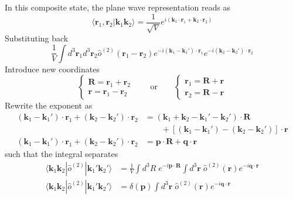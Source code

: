 \documentclass[../../../main.tex]{subfiles}
\begin{document}
In this composite state,  the plane wave representation reads as
\begin{equation*}
  \langle \mathbf{r}_1,\mathbf{r}_2 | \mathbf{k}_1 \mathbf{k}_2 \rangle
  = \frac{1 }{\sqrt{V}}  e ^{i(\mathbf{k}_1 \cdot  \mathbf{r}_1+\mathbf{k}_2 \cdot  \mathbf{r}_2)}
\end{equation*}
Substituting back
\begin{equation*}
  \frac{1}{V} \int d^3 \mathbf{r}_1 d^3 \mathbf{r}_2 \hat{o}^{(2)}(\mathbf{r}_1 -\mathbf{r}_2) e^{-i(\mathbf{k}_1 - \mathbf{k}_1') \cdot \mathbf{r}_1} e^{-i(\mathbf{k}_2 -\mathbf{k}_2') \cdot \mathbf{r}_2}
\end{equation*}
Introduce new coordinates
\begin{equation*}
  \begin{cases}
    \mathbf{R }=\mathbf{r }_1 +\mathbf{r}_2 \\
    \mathbf{r }=\mathbf{r }_1 -\mathbf{r}_2
  \end{cases}
  \qquad
  \text{or}
  \qquad
  \begin{cases}
    \mathbf{r}_1=\mathbf{R } +\mathbf{r} \\
    \mathbf{r}_2=\mathbf{R } -\mathbf{r}
  \end{cases}
\end{equation*}
Rewrite the exponent as
\begin{align*}
  (\mathbf{k}_1 - \mathbf{k}_1') \cdot \mathbf{r}_1 + (\mathbf{k}_2 - \mathbf{k}_2') \cdot \mathbf{r}_2
   & =  (\mathbf{k}_1 + \mathbf{k}_2 - \mathbf{k}_1' - \mathbf{k}_2') \cdot \mathbf{R }                     \\
   & \qquad+ \left[ (\mathbf{k}_1 - \mathbf{k}_1') - (\mathbf{k}_2 - \mathbf{k}_2') \right]\cdot \mathbf{r} \\
  (\mathbf{k}_1 - \mathbf{k}_1') \cdot \mathbf{r}_1 + (\mathbf{k}_2 - \mathbf{k}_2') \cdot \mathbf{r}_2
   & = \mathbf{p }\cdot \mathbf{R }+ \mathbf{q }\cdot \mathbf{r}
\end{align*}
such that the integral separates
\begin{align*}
  \langle \mathbf{k}_1 \mathbf{k}_2 | \hat{o}^{(2)} | \mathbf{k}_1' \mathbf{k}_2' \rangle
   & = \frac{1 }{V}  \int d^3 R \; e^{-i \mathbf{p}\cdot \mathbf{R}} \int d^3 \mathbf{r}\; \hat{o}^{(2)}(\mathbf{r}) e^{-i \mathbf{q} \cdot \mathbf{r}} \\
  \langle \mathbf{k}_1 \mathbf{k}_2 | \hat{o}^{(2)} | \mathbf{k}_1' \mathbf{k}_2' \rangle
   & =  \delta (\mathbf{p}) \int d^3 \mathbf{r}\; \hat{o}^{(2)}(\mathbf{r}) e^{-i \mathbf{q} \cdot \mathbf{r}}
\end{align*}
\end{document}
